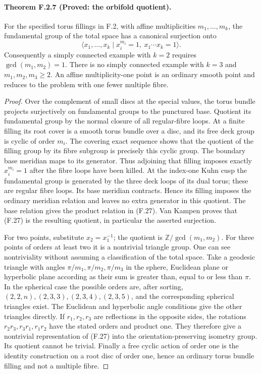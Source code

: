 \paragraph{Theorem F.2.7 (Proved: the orbifold quotient).}
For the specified torus fillings in F.2, with affine
multiplicities $m_1,\ldots,m_k$, the fundamental group of the
total space has a canonical surjection onto
\[
 \langle x_1,\ldots,x_k\mid
       x_i^{m_i}=1,\ x_1\cdots x_k=1\rangle.
 \tag{F.27}
\]
Consequently a simply connected example with $k=2$ requires
$\gcd(m_1,m_2)=1$.  There is no simply connected example with
$k=3$ and $m_1,m_2,m_3\geq2$.  An affine multiplicity-one
point is an ordinary smooth point and reduces to the problem
with one fewer multiple fibre.

\begin{proof}
Over the complement of small discs at the special values,
the torus bundle projects surjectively on fundamental groups
to the punctured base.  Quotient its fundamental group by the
normal closure of all regular-fibre loops.  At a finite
filling its root cover is a smooth torus bundle over a disc,
and its free deck group is cyclic of order $m_i$.
The covering exact sequence shows that the quotient of the
filling group by its fibre subgroup is precisely this cyclic
group.  The boundary base meridian maps to its generator.
Thus adjoining that filling imposes exactly
$x_i^{m_i}=1$ after the fibre loops have been killed.
At the index-one Kuhn cusp the fundamental group is generated
by the three deck loops of its dual torus; these are regular
fibre loops.  Its base meridian contracts.  Hence its filling
imposes the ordinary meridian relation and leaves no extra
generator in this quotient.  The base relation gives the
product relation in (F.27).  Van Kampen proves that (F.27) is
the resulting quotient, in particular the asserted surjection.

For two points, substitute $x_2=x_1^{-1}$; the quotient is
$\mathbb Z/\gcd(m_1,m_2)$.
For three points of orders at least two it is a nontrivial
triangle group.  One can see nontriviality without assuming
a classification of the total space.  Take a geodesic triangle
with angles $\pi/m_1,\pi/m_2,\pi/m_3$ in the sphere, Euclidean
plane or hyperbolic plane according as their sum is greater
than, equal to or less than $\pi$.
In the spherical case the possible orders are, after sorting,
$(2,2,n),(2,3,3),(2,3,4),(2,3,5)$, and the corresponding
spherical triangles exist.  The Euclidean and hyperbolic
angle conditions give the other triangles directly.
If $r_1,r_2,r_3$ are reflections in the opposite sides,
the rotations $r_2r_3,r_3r_1,r_1r_2$ have the stated
orders and product one.  They therefore give a nontrivial
representation of (F.27) into the orientation-preserving
isometry group.  Its quotient cannot be trivial.
Finally a free cyclic action of order one is the identity
construction on a root disc of order one, hence an ordinary
torus bundle filling and not a multiple fibre.
\end{proof}

